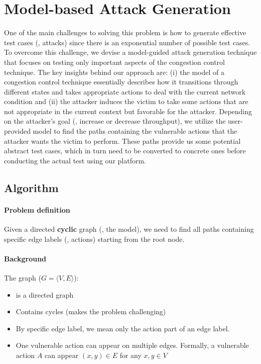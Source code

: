 \section{Model-based Attack Generation}

One of the main challenges to solving this problem is how to generate effective test cases (\ie, attacks)
since there is an exponential number of possible test cases.
To overcome this challenge, we devise a model-guided attack generation technique
that focuses on testing only important aspects of the congestion control technique.
The key insights behind our approach are: (i) the model of a congestion control technique
essentially describes how it transitions through different states and
takes appropriate actions to deal with the current network condition
and (ii) the attacker induces the victim to take some actions that are not
appropriate in the current context but favorable for the attacker.
Depending on the attacker's goal (\eg, increase or decrease throughput),
we utilize the user-provided model to find the paths containing
the vulnerable actions that the attacker wants the victim to perform.
These paths provide us some potential abstract test cases, which 
in turn need to be converted to concrete ones before conducting the actual
test using our platform.

\subsection*{Algorithm}

\paragraph{Problem definition} Given a directed \textbf{cyclic} graph (\ie, the model), we need to 
find all paths containing specific edge labels (\ie, actions) starting from the root node.

\paragraph{Background} 
The graph ($G = \langle V, E \rangle$):
\begin{itemize}
  \item
  is a directed graph
  \item
  Contains cycles (makes the problem challenging)
  \item 
  By specific edge label, we mean only the action part of an edge label.
  \item 
  One vulnerable action can appear on multiple edges. 
  Formally, a vulnerable action $A$ can appear $(x, y) \in E$ for any $x, y \in V$
\end{itemize}
  

